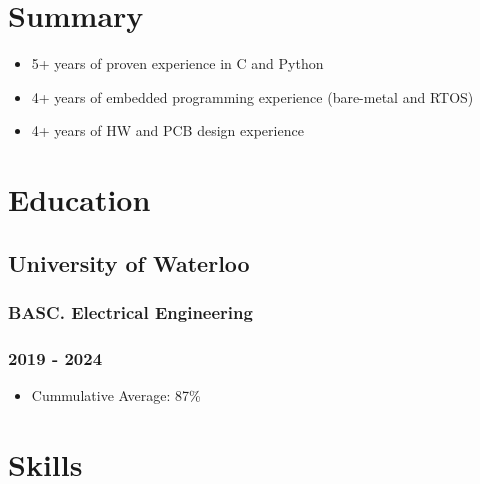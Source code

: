 \documentclass[lighthipster]{styles}
\begin{document}
\setlength{\columnsep}{1cm}
\begin{paracol}{2}




\footnotesize
{\setasidefontcolour
\flushleft

\section*{Summary}
\vspace{0.1cm}

\begin{itemize}
    \item 5+ years of proven experience in C and Python
    \item 4+ years of embedded programming experience (bare-metal and RTOS)
    \item 4+ years of HW and PCB design experience
\end{itemize}

\section*{Education}
\subsection*{University of Waterloo}
\subsubsection*{BASC. Electrical Engineering} \vspace{-0.075cm}
\subsubsection*{\color{ryanGrey}2019 - 2024}
\begin{itemize}
    \item Cummulative Average: 87\%
\end{itemize}

\section*{\textbf{Skills}}
}
\end{paracol}
\end{document}

